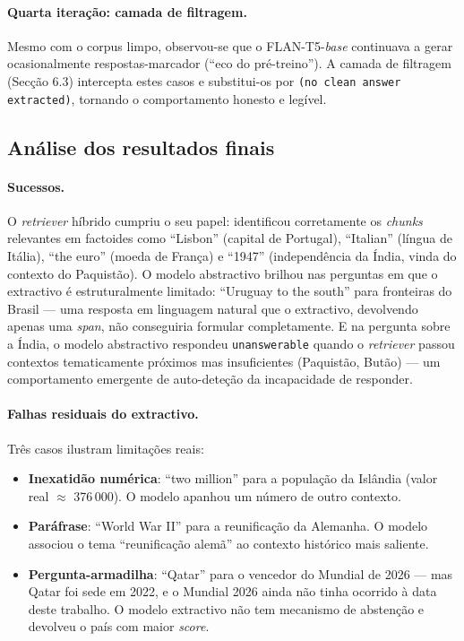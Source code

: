 \documentclass[11pt,a4paper]{article}
\begin{document}
\paragraph{Quarta iteração: camada de filtragem.} Mesmo com o corpus limpo, observou-se que o FLAN-T5-\emph{base} continuava a gerar ocasionalmente respostas-marcador (``eco do pré-treino''). A camada de filtragem (Secção 6.3) intercepta estes casos e substitui-os por \texttt{(no clean answer extracted)}, tornando o comportamento honesto e legível.

\subsection{Análise dos resultados finais}

\paragraph{Sucessos.} O \emph{retriever} híbrido cumpriu o seu papel: identificou corretamente os \emph{chunks} relevantes em factoides como ``Lisbon'' (capital de Portugal), ``Italian'' (língua de Itália), ``the euro'' (moeda de França) e ``1947'' (independência da Índia, vinda do contexto do Paquistão). O modelo abstractivo brilhou nas perguntas em que o extractivo é estruturalmente limitado: ``Uruguay to the south'' para fronteiras do Brasil --- uma resposta em linguagem natural que o extractivo, devolvendo apenas uma \emph{span}, não conseguiria formular completamente. E na pergunta sobre a Índia, o modelo abstractivo respondeu \texttt{unanswerable} quando o \emph{retriever} passou contextos tematicamente próximos mas insuficientes (Paquistão, Butão) --- um comportamento emergente de auto-deteção da incapacidade de responder.

\paragraph{Falhas residuais do extractivo.} Três casos ilustram limitações reais:
\begin{itemize}[noitemsep]
    \item \textbf{Inexatidão numérica}: ``two million'' para a população da Islândia (valor real $\approx$ 376\,000). O modelo apanhou um número de outro contexto.
    \item \textbf{Paráfrase}: ``World War II'' para a reunificação da Alemanha. O modelo associou o tema ``reunificação alemã'' ao contexto histórico mais saliente.
    \item \textbf{Pergunta-armadilha}: ``Qatar'' para o vencedor do Mundial de 2026 --- mas Qatar foi sede em 2022, e o Mundial 2026 ainda não tinha ocorrido à data deste trabalho. O modelo extractivo não tem mecanismo de abstenção e devolveu o país com maior \emph{score}.
\end{itemize}
\end{document}
